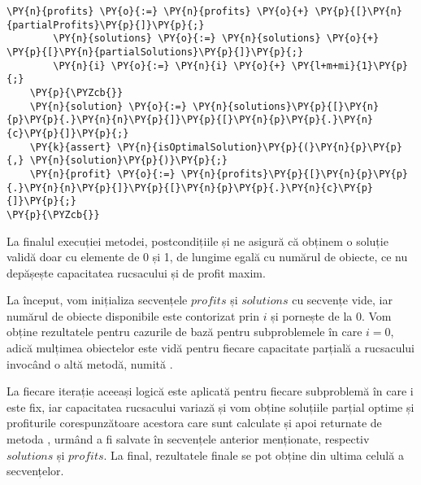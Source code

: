 \begin{sloppypar}
\begin{Verbatim}[commandchars=\\\{\}]
        \PY{n}{profits} \PY{o}{:=} \PY{n}{profits} \PY{o}{+} \PY{p}{[}\PY{n}{partialProfits}\PY{p}{]}\PY{p}{;}
        \PY{n}{solutions} \PY{o}{:=} \PY{n}{solutions} \PY{o}{+} \PY{p}{[}\PY{n}{partialSolutions}\PY{p}{]}\PY{p}{;}
        \PY{n}{i} \PY{o}{:=} \PY{n}{i} \PY{o}{+} \PY{l+m+mi}{1}\PY{p}{;} 
    \PY{p}{\PYZcb{}}
    \PY{n}{solution} \PY{o}{:=} \PY{n}{solutions}\PY{p}{[}\PY{n}{p}\PY{p}{.}\PY{n}{n}\PY{p}{]}\PY{p}{[}\PY{n}{p}\PY{p}{.}\PY{n}{c}\PY{p}{]}\PY{p}{;}
    \PY{k}{assert} \PY{n}{isOptimalSolution}\PY{p}{(}\PY{n}{p}\PY{p}{,} \PY{n}{solution}\PY{p}{)}\PY{p}{;}
    \PY{n}{profit} \PY{o}{:=} \PY{n}{profits}\PY{p}{[}\PY{n}{p}\PY{p}{.}\PY{n}{n}\PY{p}{]}\PY{p}{[}\PY{n}{p}\PY{p}{.}\PY{n}{c}\PY{p}{]}\PY{p}{;}
\PY{p}{\PYZcb{}}
\end{Verbatim}
    \par La finalul execuției metodei, postcondițiile  și  ne asigură că obținem o soluție validă doar cu elemente de 0 și 1, de lungime egală cu numărul de obiecte, ce nu depășește capacitatea rucsacului și de profit maxim.
    \par La început, vom inițializa secvențele $profits$ și $solutions$ cu secvențe vide, iar numărul de obiecte disponibile este contorizat prin $i$ și pornește de la 0. Vom obține rezultatele pentru cazurile de bază pentru subproblemele în care $i = 0$, adică mulțimea obiectelor este vidă pentru fiecare capacitate parțială a rucsacului invocând o altă metodă, 
    numită .
    \par La fiecare iterație aceeași logică este aplicată pentru fiecare subproblemă în care i este fix, iar capacitatea rucsacului variază și vom obține soluțiile parțial optime și profiturile corespunzătoare acestora care sunt calculate și apoi returnate de metoda , urmând a fi salvate în secvențele anterior menționate, respectiv $solutions$ și $profits$. La final, rezultatele finale se pot obține din ultima celulă a secvențelor. \\ \par


\end{sloppypar}
